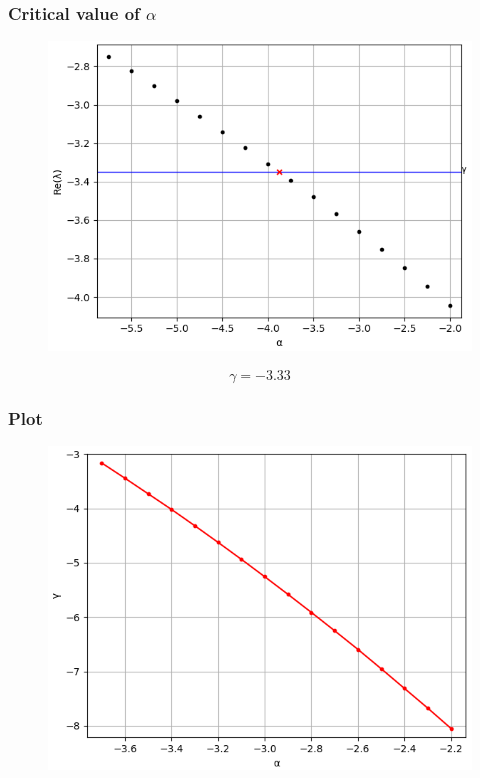 \documentclass[fullscreen=true, unicode, bookmarks=false]{beamer}
\begin{document}
\begin{frame}
\frametitle{ Critical value of $ \alpha $ } 

\begin{figure}
\includegraphics[scale=0.55]{Critical_alpha.png} 
\end{figure}
{\footnotesize $$ \gamma = -3.33 $$}

\end{frame}

\begin{frame}
\frametitle{ Plot } 

\begin{figure}
\includegraphics[scale=0.65]{Critical_relation.png} 
\end{figure}

\end{frame}
\end{document}

